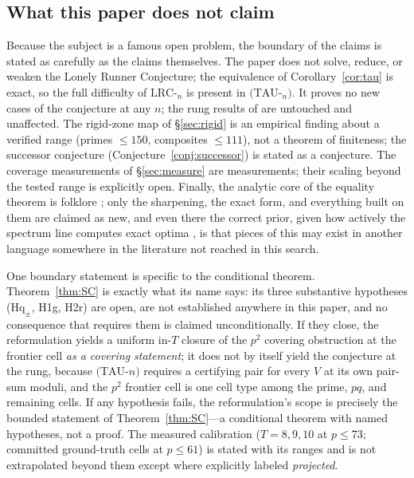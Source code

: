 \documentclass[11pt,a4paper]{article}
\numberwithin{equation}{section}
\theoremstyle{plain}
\theoremstyle{definition}
\theoremstyle{remark}
\begin{document}
\subsection{What this paper does not claim}

Because the subject is a famous open problem, the boundary of the claims
is stated as carefully as the claims themselves. The paper does not solve,
reduce, or weaken the Lonely Runner Conjecture; the equivalence of
Corollary~\ref{cor:tau} is exact, so the full difficulty of
$\mathrm{LRC}$-$_n$ is present in $(\mathrm{TAU}$-$_n)$. It proves no new
cases of the conjecture at any $n$; the rung results of
\cite{Rosenfeld8,Trakulthongchai,Sungkawichai,Allikvere} are untouched and
unaffected. The rigid-zone map of \S\ref{sec:rigid} is an empirical
finding about a verified range (primes $\le 150$, composites $\le 111$),
not a theorem of finiteness; the successor conjecture
(Conjecture~\ref{conj:successor}) is stated as a conjecture. The coverage
measurements of \S\ref{sec:measure} are measurements; their scaling
beyond the tested range is explicitly open. Finally, the analytic core of
the equality theorem is folklore \cite{Tao-blog}; only the sharpening, the
exact form, and everything built on them are claimed as new, and even
there the correct prior, given how actively the spectrum line computes
exact optima \cite{Cordella}, is that pieces of this may exist in another
language somewhere in the literature not reached in this search.

One boundary statement is specific to the conditional theorem.
Theorem~\ref{thm:SC} is exactly what its name says: its three substantive
hypotheses ($\mathrm{Hq}_\pm$, H1g, H2r) are open, are not established
anywhere in this paper, and no consequence that requires them is claimed
unconditionally. If they close, the reformulation yields a uniform
in-$T$ closure of the $p^2$ covering obstruction at the frontier cell
\emph{as a covering statement}; it does not by itself yield the
conjecture at the rung, because $(\mathrm{TAU}$-$n)$ requires a certifying
pair for every $V$ at its own pair-sum moduli, and the $p^2$ frontier
cell is one cell type among the prime, $pq$, and remaining cells. If any
hypothesis fails, the reformulation's scope is precisely the bounded
statement of Theorem~\ref{thm:SC}---a conditional theorem with named
hypotheses, not a proof. The measured calibration ($T=8,9,10$ at $p\le73$; committed
ground-truth cells at $p\le61$) is stated with its ranges and is not
extrapolated beyond them except where explicitly labeled
\emph{projected}.
\end{document}
